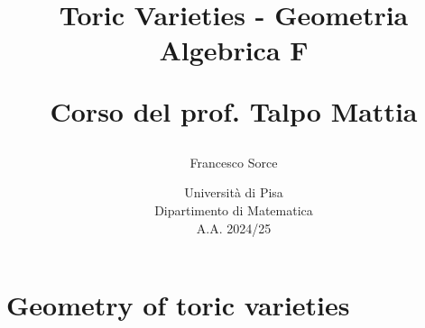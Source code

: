 \documentclass[a4paper]{report}
\title{\huge Toric Varieties - Geometria Algebrica F
\vspace{0.7cm}

\Large Corso del prof. Talpo Mattia}
\author{\Large Francesco Sorce}
\date{Università di Pisa\\
Dipartimento di Matematica\\
A.A. 2024/25}
\begin{document}
\maketitle

\tableofcontents
\newpage



\part{Geometry of toric varieties}







\appendix


\end{document}
